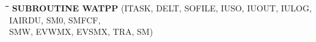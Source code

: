 \documentclass[11pt]{article}
\begin{document}
\bigskip
\bigskip
\bigskip
\bigskip
\nwln
\begin{tabbing}
\hspace{1.27cm}\=\hspace{1.27cm}\=\hspace{1.27cm}\=\hspace{1.27cm}\=%
\hspace{1.27cm}\=\hspace{1.27cm}\=\hspace{1.27cm}\=\hspace{1.27cm}\=%
\hspace{1.27cm}\=\hspace{1.27cm}\=\kill
{\bf SUBROUTINE WATPP}\> \> \> (ITASK, DELT, SOFILE, IUSO, IUOUT, IULOG, IAIRDU, SM0, SMFCF,\\
 \>\> \> \>  SMW, EVWMX, EVSMX, TRA, SM)
\end{tabbing}
\nwln
\end{document}
